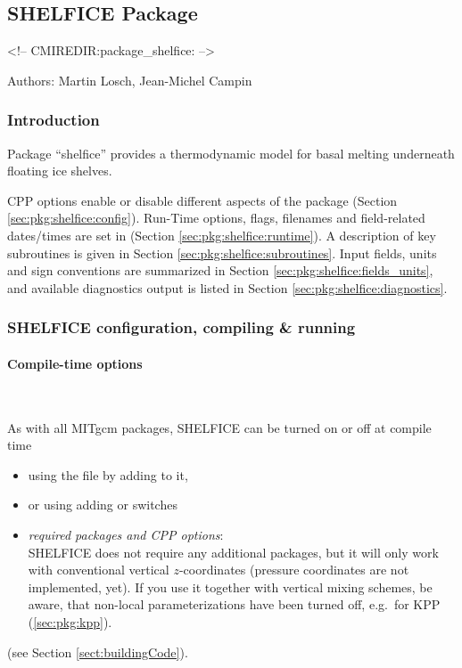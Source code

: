 
\subsection{SHELFICE Package}
\label{sec:pkg:shelfice}
\begin{rawhtml}
<!-- CMIREDIR:package_shelfice: -->
\end{rawhtml}

Authors: Martin Losch, Jean-Michel Campin

\subsubsection{Introduction
\label{sec:pkg:exf:intro}}


Package ``shelfice'' provides a thermodynamic model for basal melting
underneath floating ice shelves.

CPP options enable or disable different aspects of the package
(Section \ref{sec:pkg:shelfice:config}).
Run-Time options, flags, filenames and field-related dates/times are
set in 
(Section \ref{sec:pkg:shelfice:runtime}).
A description of key subroutines is given in Section
\ref{sec:pkg:shelfice:subroutines}.
Input fields, units and sign conventions are summarized in
Section \ref{sec:pkg:shelfice:fields_units}, and available diagnostics
output is listed in Section \ref{sec:pkg:shelfice:diagnostics}.


\subsubsection{SHELFICE configuration, compiling \& running}

\paragraph{Compile-time options
\label{sec:pkg:shelfice:config}}
~

As with all MITgcm packages, SHELFICE can be turned on or off at compile time
%
\begin{itemize}
%
\item
using the  file by adding  to it,
%
\item
or using  adding
 or  switches
%
\item
\textit{required packages and CPP options}: \\
SHELFICE does not require any additional packages, but it will only
work with conventional vertical $z$-coordinates (pressure coordinates
are not implemented, yet). If you use it together with vertical mixing
schemes, be aware, that non-local parameterizations have been turned
off, e.g.\ for KPP (\ref{sec:pkg:kpp}).
%
\end{itemize}
(see Section \ref{sect:buildingCode}).

